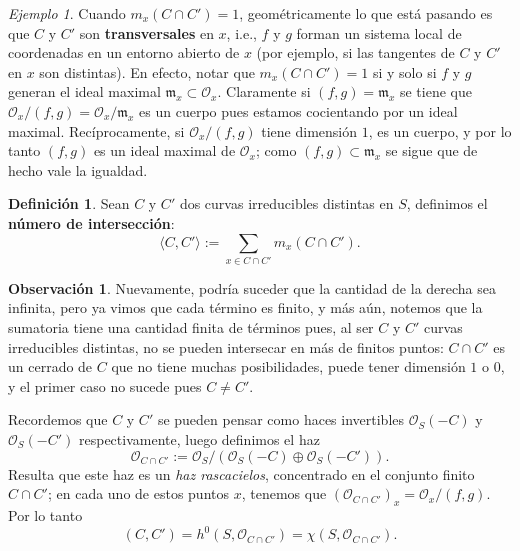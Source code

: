\documentclass[spanish,12pt]{amsart}
\theoremstyle{definition}
\newtheorem{definition}[theorem]{Definición}
\newtheorem{obs}[theorem]{Observación}
\theoremstyle{remark}
\newtheorem{example}[theorem]{Ejemplo}
\numberwithin{equation}{section}
\renewcommand{\O}{\mathcal{O}}
\begin{document}
\begin{example}
Cuando $m_x ( C \cap C') = 1$, geométricamente lo que está pasando es que $C$ y $C'$ son \textbf{transversales} en $x$, i.e., $f$ y $g$ forman un sistema local de coordenadas en un entorno abierto de $x$ (por ejemplo, si las tangentes de $C$ y $C'$ en $x$ son distintas). En efecto, notar que $m_x (C \cap C') = 1$ si y solo si $f$ y $g$ generan el ideal maximal $\mathfrak m_x \subset \O_x$. Claramente si $(f,g) = \mathfrak m_x$ se tiene que $\O_x / (f,g) = \O_x / \mathfrak m_x$ es un cuerpo pues estamos cocientando por un ideal maximal. Recíprocamente, si $\O_x /(f,g)$ tiene dimensión $1$, es un cuerpo, y por lo tanto $(f,g)$ es un ideal maximal de $\O_x$; como $(f,g) \subset \mathfrak m_x$ se sigue que de hecho vale la igualdad.
\end{example}

\begin{center}
\centering
{}

\end{center}




\begin{definition}
Sean $C$ y $C'$ dos curvas irreducibles distintas en $S$, definimos el \textbf{número de intersección}:
\[
    \langle C, C' \rangle := \sum_{x \in C \cap C'} m_x (C \cap C').
\]
\end{definition}

\begin{obs}
Nuevamente, podría suceder que la cantidad de la derecha sea infinita, pero ya vimos que cada término es finito, y más aún, notemos que la sumatoria tiene una cantidad finita de términos pues, al ser $C$ y $C'$ curvas irreducibles distintas, no se pueden intersecar en más de finitos puntos: $C\cap C'$ es un cerrado de $C$ que no tiene muchas posibilidades, puede tener dimensión $1$ o $0$, y el primer caso no sucede pues $C \neq C'$.
\end{obs}

Recordemos que $C$ y $C'$ se pueden pensar como haces invertibles $\O_S (-C)$ y $\O_S (-C')$ respectivamente, luego definimos el haz
\[
    \O_{C \cap C'} := \O_S \big / \left ( \O_S (-C) \oplus \O_S (-C') \right).
\]
Resulta que este haz es un \textit{haz rascacielos}, concentrado en el conjunto finito $C \cap C'$; en cada uno de estos puntos $x$, tenemos que $(\O_{C \cap C'})_x = \O_x / (f,g)$. Por lo tanto
\[
    (C,C') = h^0 (S, \O_{C\cap C'})  = \chi (S, \O_{C \cap C'}).
\]
\end{document}
